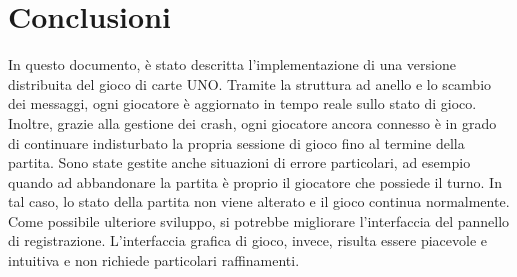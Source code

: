 \documentclass[11pt]{article} %
\begin{document}
\section{Conclusioni}
In questo documento, è stato descritta l'implementazione di una versione distribuita del gioco di carte UNO. Tramite la struttura ad anello e 
lo scambio dei messaggi, ogni giocatore è aggiornato in tempo reale sullo stato di gioco. 
Inoltre, grazie alla gestione dei crash, ogni giocatore ancora connesso è in grado di continuare indisturbato
la propria sessione di gioco fino al termine della partita. Sono state gestite anche situazioni di errore particolari, ad esempio quando ad abbandonare la partita
è proprio il giocatore che possiede il turno. In tal caso, lo stato della partita non viene alterato e il gioco continua normalmente.\\
Come possibile ulteriore sviluppo, si potrebbe migliorare l'interfaccia del pannello di registrazione.
L'interfaccia grafica di gioco, invece, risulta essere piacevole e intuitiva e non richiede particolari raffinamenti.  
\end{document}
